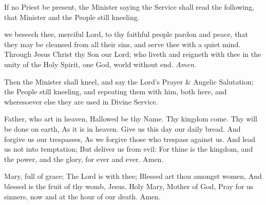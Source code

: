 \begin{rubric}
    If no Priest be present, the Minister saying the Service shall read the following, that Minister and the People still kneeling.
\end{rubric}
 we beseech thee, merciful Lord, to thy faithful people pardon and peace, that they may be cleansed from all their sins, and serve thee with a quiet mind. Through Jesus Christ thy Son our Lord; who liveth and reigneth with thee in the unity of the Holy Spirit, one God, world without end. \textit{Amen.}

\begin{rubric}
    Then the Minister shall kneel, and say the Lord's Prayer \& Angelic Salutation; the People still kneeling, and repeating them with him, both here, and wheresoever else they are used in Divine Service.
\end{rubric}
 Father, who art in heaven, Hallowed be thy Name. Thy kingdom come. Thy will be done on earth, As it is in heaven. Give us this day our daily bread. And forgive us our trespasses, As we forgive those who trespass against us. And lead us not into temptation; But deliver us from evil: For thine is the kingdom, and the power, and the glory, for ever and ever. Amen.
\par\noindent
{}
 Mary, full of grace; The Lord is with thee; Blessed art thou amongst women, And blessed is the fruit of thy womb, Jesus. Holy Mary, Mother of God, Pray for us sinners, now and at the hour of our death. Amen.
